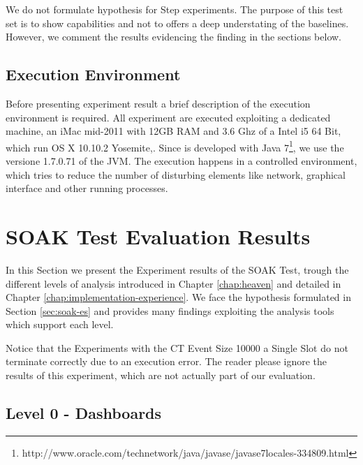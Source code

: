 We do not formulate hypothesis for Step experiments. The purpose of this test set is to show \name capabilities and not to offers a deep understating of the baselines. However, we comment the results evidencing the finding in the sections below.

\subsection{Execution Environment}\label{sec:execution-environment}

Before presenting experiment result a brief description of the execution environment is required. All experiment are executed exploiting a dedicated machine, an iMac mid-2011 with 12GB RAM and 3.6 Ghz of a Intel i5 64 Bit, which run OS X 10.10.2 Yosemite,. Since \name is developed with Java 7\footnote{http://www.oracle.com/technetwork/java/javase/javase7locales-334809.html}, we use the versione 1.7.0.71 of the JVM.
The execution happens in a controlled environment, which tries to reduce the number of disturbing elements like network, graphical interface and other running processes.

\section{SOAK Test Evaluation Results}\label{sec:soakres}

In this Section we present the Experiment results of the SOAK Test, trough the different levels of analysis introduced in Chapter \ref{chap:heaven} and detailed in Chapter \ref{chap:implementation-experience}. We face the hypothesis formulated in Section \ref{sec:soak-es} and provides many findings exploiting the analysis tools which support each level.

Notice that the Experiments with the CT Event Size  10000 a Single Slot do not terminate correctly due to an execution error. The reader please ignore the results of this experiment, which are not actually part of our evaluation.

\subsection{Level 0 - Dashboards}

